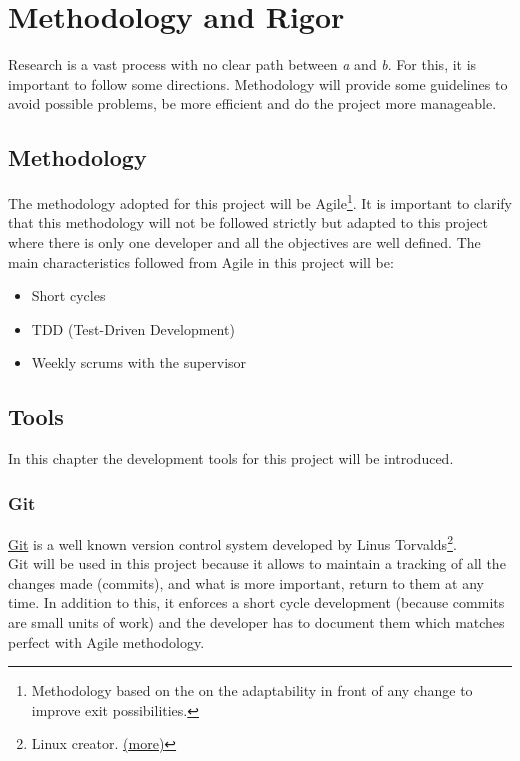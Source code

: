 \chapter{Methodology and Rigor} %

\label{Chapter4} %

Research is a vast process with no clear path between \emph{a} and \emph{b}. For this, it is important to follow some directions. Methodology will provide some guidelines to avoid possible problems, be more efficient and do the project more manageable. 

\section{Methodology}
The methodology adopted for this project will be Agile\footnote{Methodology based on the on the adaptability in front of any change to improve exit possibilities.}. It is important to clarify that this methodology will not be followed strictly but adapted to this project where there is only one developer and all the objectives are well defined. The main characteristics followed from Agile in this project will be:
\begin{itemize}
	\item Short cycles
	\item TDD (Test-Driven Development)
	\item Weekly scrums with the supervisor
\end{itemize}

\section{Tools}
In this chapter the development tools for this project will be introduced. 
\subsection{Git}
\href{https://git-scm.com/}{Git} is a well known version control system developed by Linus Torvalds\footnote{Linux creator. \href{https://en.wikipedia.org/wiki/Linus_Torvalds}{(more)}}.\\
Git will be used in this project because it allows to maintain a tracking of all the changes made (commits), and what is more important, return to them at any time. In addition to this, it enforces a short cycle development (because commits are small units of work) and the developer has to document them which matches perfect with Agile methodology. 
